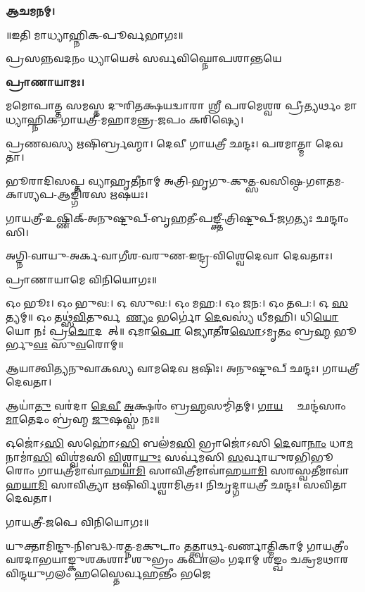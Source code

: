 \textbf{𑌆𑌚𑌮𑌨𑌮𑍍।}


\centerline{॥𑌇𑌤𑌿 𑌮𑌾𑌧𑍍𑌯𑌾𑌹𑍍𑌨𑌿𑌕-𑌪𑍂𑌰𑍍𑌵𑌭𑌾𑌗𑌃॥}



{𑌪𑍍𑌰𑌸𑌨𑍍𑌨𑌵𑌦𑌨𑌂 𑌧𑍍𑌯𑌾𑌯𑍇𑌤𑍍 𑌸𑌰𑍍𑌵𑌵𑌿𑌘𑍍𑌨𑍋𑌪𑌶𑌾𑌨𑍍𑌤𑌯𑍇}

\textbf{𑌪𑍍𑌰𑌾𑌣𑌾𑌯𑌾𑌮𑌃।}

𑌮𑌮𑍋𑌪𑌾𑌤𑍍𑌤 𑌸𑌮𑌸𑍍𑌤 𑌦𑍁𑌰𑌿𑌤𑌕𑍍𑌷𑌯𑌦𑍍𑌵𑌾𑌰𑌾 𑌶𑍍𑌰𑍀 𑌪𑌰𑌮𑍇𑌶𑍍𑌵𑌰 𑌪𑍍𑌰𑍀𑌤𑍍𑌯𑌰𑍍𑌥𑌂 𑌮𑌾𑌧𑍍𑌯𑌾𑌹𑍍𑌨𑌿𑌕-𑌗𑌾𑌯𑌤𑍍𑌰𑍀-𑌮𑌹𑌾𑌮𑌨𑍍𑌤𑍍𑌰-𑌜𑌪𑌂 𑌕𑌰𑌿𑌷𑍍𑌯𑍇।


𑌪𑍍𑌰𑌣𑌵𑌸𑍍𑌯 𑌋𑌷𑌿𑌰𑍍𑌬𑍍𑌰𑌹𑍍𑌮𑌾।
𑌦𑍇𑌵𑍀 𑌗𑌾𑌯𑌤𑍍𑌰𑍀 𑌛𑌨𑍍𑌦𑌃।
𑌪𑌰𑌮𑌾𑌤𑍍𑌮𑌾 𑌦𑍇𑌵𑌤𑌾।

𑌭𑍂𑌰𑌾𑌦𑌿𑌸𑌪𑍍𑌤 𑌵𑍍𑌯𑌾𑌹𑍃𑌤𑍀𑌨𑌾𑌮𑍍 𑌅𑌤𑍍𑌰𑌿-𑌭𑍃𑌗𑍁-𑌕𑍁𑌤𑍍𑌸-𑌵𑌸𑌿𑌷𑍍𑌠-𑌗𑍗𑌤𑌮-𑌕𑌾𑌶𑍍𑌯𑌪-𑌆𑌙𑍍𑌗𑌿𑌰𑌸 𑌋𑌷𑌯𑌃।

𑌗𑌾𑌯𑌤𑍍𑌰𑍀-𑌉𑌷𑍍𑌣𑌿𑌕𑍍-𑌅𑌨𑍁𑌷𑍍𑌟𑍁𑌪𑍍-𑌬𑍃𑌹𑌤𑍀-𑌪𑌙𑍍𑌕𑍍𑌤𑍀-𑌤𑍍𑌰𑌿𑌷𑍍𑌟𑍁𑌪𑍍-𑌜𑌗𑌤𑍍𑌯𑌃 𑌛𑌨𑍍𑌦𑌾𑌂𑌸𑌿।

𑌅𑌗𑍍𑌨𑌿-𑌵𑌾𑌯𑍁-𑌅𑌰𑍍𑌕-𑌵𑌾𑌗𑍀𑌶-𑌵𑌰𑍁𑌣-𑌇𑌨𑍍𑌦𑍍𑌰-𑌵𑌿𑌶𑍍𑌵𑍇𑌦𑍇𑌵𑌾 𑌦𑍇𑌵𑌤𑌾𑌃।
      
𑌪𑍍𑌰𑌾𑌣𑌾𑌯𑌾𑌮𑍇 𑌵𑌿𑌨𑌿𑌯𑍋𑌗𑌃॥


𑌓𑌂 𑌭𑍂𑌃। 𑌓𑌂 𑌭𑍁𑌵:। 𑌓 𑌸𑍁𑌵:। 𑌓𑌂 𑌮𑌹:। 𑌓𑌂 𑌜𑌨:। 𑌓𑌂 𑌤𑌪:। 𑌓 \ul{𑌸}𑌤𑍍𑌯𑌮𑍍॥
𑌓𑌂 𑌤𑌥𑍍𑌸॑\ul{𑌵𑌿}𑌤𑍁𑌰𑍍𑌵𑌰𑍇᳚\ul{𑌣𑍍𑌯𑌂} 𑌭𑌰𑍍𑌗𑍋॑ \ul{𑌦𑍇}𑌵𑌸𑍍𑌯॑ 𑌧𑍀𑌮𑌹𑌿। 𑌧𑌿\ul{𑌯𑍋} 𑌯𑍋 𑌨𑌃॑ 𑌪𑍍𑌰\ul{𑌚𑍋}𑌦𑌯𑌾᳚𑌤𑍍॥
𑌓𑌮𑌾\ul{𑌪𑍋} 𑌜𑍍𑌯𑍋\ul{𑌤𑍀}𑌰\ul{𑌸𑍋}𑌽𑌮𑍃\ul{𑌤𑌂} 𑌬𑍍𑌰\ul{𑌹𑍍𑌮} 𑌭𑍂𑌰𑍍𑌭𑍁\ul{𑌵𑌃} 𑌸𑍁\ul{𑌵}𑌰𑍋𑌮𑍍॥




𑌆𑌯𑌾𑌤𑍍𑌵𑌿𑌤𑍍𑌯𑌨𑍁𑌵𑌾𑌕𑌸𑍍𑌯 𑌵𑌾𑌮𑌦𑍇𑌵 𑌋𑌷𑌿𑌃।
𑌅𑌨𑍁𑌷𑍍𑌟𑍁𑌪𑍍 𑌛𑌨𑍍𑌦𑌃।
𑌗𑌾𑌯𑌤𑍍𑌰𑍀 𑌦𑍇𑌵𑌤𑌾।

𑌆𑌯𑌾॑\ul{𑌤𑍁} 𑌵𑌰॑𑌦𑌾 \ul{𑌦𑍇}\ul{𑌵𑍀} \ul{𑌅}𑌕𑍍𑌷𑌰𑌂॑ 𑌬𑍍𑌰\ul{𑌹𑍍𑌮}𑌸𑌮𑍍𑌮𑌿॑𑌤𑌮𑍍। \ul{𑌗𑌾}\ul{𑌯}𑌤𑍍𑌰𑍀𑌂᳚ 𑌛𑌨𑍍𑌦॑𑌸𑌾𑌂 \ul{𑌮𑌾}𑌤𑍇𑌦𑌂 𑌬𑍍𑌰॑𑌹𑍍𑌮 \ul{𑌜𑍁}𑌷𑌸𑍍𑌵॑ 𑌨𑌃॥

𑌓𑌜𑍋॑𑌽\ul{𑌸𑌿} 𑌸𑌹𑍋॑𑌽\ul{𑌸𑌿} 𑌬𑌲॑𑌮\ul{𑌸𑌿} 𑌭𑍍𑌰𑌾𑌜𑍋॑𑌽𑌸𑌿 \ul{𑌦𑍇}𑌵𑌾\ul{𑌨𑌾𑌂} 𑌧𑌾\ul{𑌮} 𑌨𑌾𑌮𑌾॑\ul{𑌸𑌿} 𑌵𑌿𑌶𑍍𑌵॑𑌮𑌸𑌿 \ul{𑌵𑌿}𑌶𑍍𑌵𑌾\ul{𑌯𑍁𑌃} 𑌸𑌰𑍍𑌵॑𑌮𑌸𑌿 \ul{𑌸}𑌰𑍍𑌵𑌾𑌯𑍁𑌰𑌭𑌿𑌭𑍂𑌰𑍋𑌂 𑌗𑌾𑌯𑌤𑍍𑌰𑍀𑌮𑌾𑌵𑌾॑𑌹\ul{𑌯𑌾}\ul{𑌮𑌿} 𑌸𑌾𑌵𑌿𑌤𑍍𑌰𑍀𑌮𑌾𑌵𑌾॑𑌹\ul{𑌯𑌾}\ul{𑌮𑌿} 𑌸𑌰𑌸𑍍𑌵𑌤𑍀𑌮𑌾𑌵𑌾॑𑌹\-\ul{𑌯𑌾}\ul{𑌮𑌿} 𑌸𑌾𑌵𑌿𑌤𑍍𑌰𑍍𑌯𑌾 𑌋𑌷𑌿𑌰𑍍𑌵𑌿𑌶𑍍𑌵𑌾𑌮𑌿𑌤𑍍𑌰𑌃। 𑌨𑌿𑌚𑍃𑌦𑍍𑌗𑌾𑌯𑌤𑍍𑌰𑍀 𑌛𑌨𑍍𑌦𑌃। 𑌸𑌵𑌿𑌤𑌾 𑌦𑍇𑌵𑌤𑌾।

𑌗𑌾𑌯𑌤𑍍𑌰𑍀-𑌜𑌪𑍇 𑌵𑌿𑌨𑌿𑌯𑍋𑌗𑌃॥



{𑌯𑍁𑌕𑍍𑌤𑌾𑌮𑌿𑌨𑍍𑌦𑍁-𑌨𑌿𑌬𑌦𑍍𑌧-𑌰𑌤𑍍𑌨-𑌮𑌕𑍁𑌟𑌾𑌂 𑌤𑌤𑍍𑌤𑍍𑌵𑌾𑌰𑍍𑌥-𑌵𑌰𑍍𑌣𑌾𑌤𑍍𑌮𑌿𑌕𑌾𑌮𑍍}
{𑌗𑌾𑌯𑌤𑍍𑌰𑍀𑌂 𑌵𑌰𑌦𑌾𑌭𑌯𑌾𑌙𑍍𑌕𑍁𑌶𑌕𑌶𑌾𑌃 𑌶𑍁𑌭𑍍𑌰𑌂 𑌕𑌪𑌾𑌲𑌂 𑌗𑌦𑌾𑌮𑍍}
{𑌶𑌙𑍍𑌖𑌂 𑌚𑌕𑍍𑌰𑌮𑌥𑌾𑌰𑌵𑌿𑌨𑍍𑌦𑌯𑍁𑌗𑌲𑌂 𑌹𑌸𑍍𑌤𑍈𑌰𑍍𑌵𑌹𑌨𑍍𑌤𑍀𑌂 𑌭𑌜𑍇}

